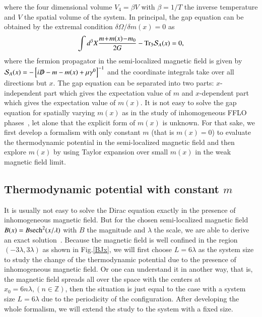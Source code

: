 \documentclass[aps,prd,amsmath,two column,amssymb,showpacs]{revtex4}
\begin{document}
where the four dimensional volume $V_4=\beta V$ with $\beta=1/T$ the inverse temperature and $V$ the spatial volume of the system. In principal, the gap equation can be obtained by the extremal condition $\delta\Omega/\delta m(x)=0$ as
\begin{eqnarray}\label{gap1}
\int d^3X{m\!+\!m(x)\!-\!m_0\over 2G}-\text {Tr}_3{\cal S}_{A}(x)=0,
\end{eqnarray}
where the fermion propagator in the semi-localized magnetic field is given by ${\cal S}_{A}(x)=-\left[i{\slashed D}-m-m(x)+{\mu}\gamma^0\right]^{-1}$ and the coordinate integrals take over all directions but $x$. The gap equation can be separated into two parts: $x$-independent part which gives the expectation value of $m$ and $x$-dependent part which gives the expectation value of $m(x)$. It is not easy to solve the gap equation for spatially varying $m(x)$ as in the study of inhomogeneous FFLO phases~\cite{Bowers:2002xr,Nickel:2009ke,Cao:2015rea,Cao:2015taa,Cao:2016fby}, let alone that the explicit form of $m(x)$ is unknown. For that sake, we first develop a formalism with only constant $m$ (that is $m(x)=0$) to evaluate the thermodynamic potential in the semi-localized magnetic field and then explore $m(x)$ by using Taylor expansion over small $m(x)$ in the weak magnetic field limit.


\subsection{Thermodynamic potential with constant $m$}\label{potential}

It is usually not easy to solve the Dirac equation exactly in the presence of inhomogeneous magnetic field. But for the chosen semi-localized magnetic field $B(x)=B{\rm sech}^2(x/\lambda)$ with $B$ the magnitude and $\lambda$ the scale, we are able to derive an exact solution~\cite{Cangemi:1995ee,Dunne:1997kw}. Because the magnetic field is well confined in the region $(-3\lambda,3\lambda)$ as shown in Fig.\ref{BJx}, we will first choose $L=6\lambda$ as the system size to study the change of the thermodynamic potential due to the presence of inhomogeneous magnetic field. Or one can understand it in another way, that is, the magnetic field spreads all over the space with the centers at $x_0=6n\lambda, (n\in \mathbb{Z})$, then the situation is just equal to the case with a system size $L=6\lambda$ due to the periodicity of the configuration. After developing the whole formalism, we will extend the study to the system with a fixed size.
\end{document}
